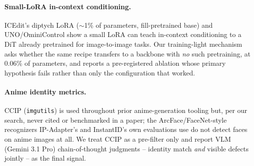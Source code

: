 \paragraph{Small-LoRA in-context conditioning.} ICEdit's diptych LoRA
($\sim$1\% of parameters, fill-pretrained base) and UNO/OminiControl show
a small LoRA can teach in-context conditioning to a DiT already
pretrained for image-to-image tasks. Our training-light mechanism asks
whether the same recipe transfers to a backbone with \emph{no} such
pretraining, at 0.06\% of parameters, and reports a pre-registered
ablation whose primary hypothesis fails rather than only the
configuration that worked.

\paragraph{Anime identity metrics.} CCIP (\texttt{imgutils}) is used
throughout prior anime-generation tooling but, per our search, never
cited or benchmarked in a paper; the ArcFace/FaceNet-style recognizers
IP-Adapter's and InstantID's own evaluations use do not detect faces on
anime images at all. We treat CCIP as a pre-filter only and report VLM
(Gemini 3.1 Pro) chain-of-thought judgments -- identity match
\emph{and} visible defects jointly -- as the final signal.
